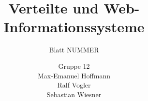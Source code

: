 \documentclass[11pt,a4paper]{scrartcl}
\begin{document}
\author{Gruppe 12\\Max-Emanuel Hoffmann\\Ralf Vogler\\Sebastian Wiesner}
\title{Verteilte und Web-Informationssysteme}
\subtitle{Blatt NUMMER}

\maketitle
\end{document}
